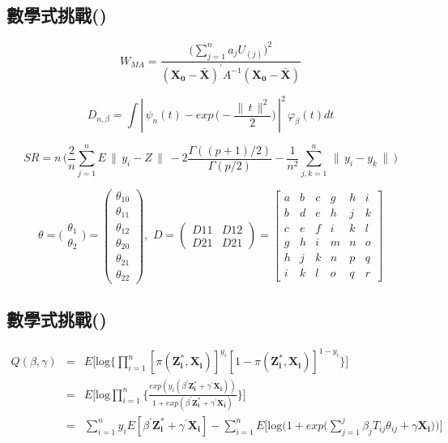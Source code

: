 \subsection{數學式挑戰(\uppercase\expandafter{})}
$$W_{MA} = \frac{\bigg( \sum_{j = 1}^n a_j U_{(j)}\bigg)^2}{(\mathbf{X_0} - \bar{\mathbf{X}})^{\displaystyle '} A^{-1}(\mathbf{X_0} - \bar{\mathbf{X}})}$$

$$D_{n, \beta} = \int |\,\psi_n(t) - exp \,\bigg( -\frac{\lVert\, t \,\lVert ^2}{2} \bigg) \,|^2 \,\varphi_{\beta}(t)dt$$

$$SR = n \,\bigg(\frac{2}{n}\sum_{j = 1}^{n} E\,\lVert\,y_i - Z\,\lVert \,- 2\frac{\Gamma((p+1)/2)}{\Gamma(p/2)} - \frac{1}{n^2} \sum_{j,k = 1}^{n}\, \lVert\, y_i - y_k \,\lVert\,\bigg)$$

$$ \theta = \bigg(
\begin{array}{c}
\theta_1 \\
\theta_2 
\end{array} \bigg) = \left(
\begin{array}{c}
\theta_{10} \\
\theta_{11} \\
\theta_{12} \\
\theta_{20} \\
\theta_{21} \\
\theta_{22}
\end{array} \right), \,\,D = \left( 
\begin{array}{cc}
D11 & D12\\
D21 & D21
\end{array} \right) = \left[
\begin{array}{ccc|ccc}
a & b & c & g & h & i \\
b & d & e & h & j & k \\
c & e & f & i & k & l \\
\hline
g & h & i & m & n & o \\
h & j & k & n & p & q \\
i & k & l & o & q & r 
\end{array} \right] 
$$\bigskip

\subsection{數學式挑戰(\uppercase\expandafter{})}
\begin{eqnarray}
Q(\beta, \gamma) & = & E \bigg[\text{log}\bigg\{\prod_{i = 1}^n [\pi(\mathbf{Z_i^*}, \mathbf{X_i})]^{y_i}[1 - \pi(\mathbf{Z_i^*}, \mathbf{X_i})]^{1 - y_i} \bigg\}\bigg]\nonumber\\
& = & E \bigg[\text{log}\prod_{i = 1}^n \bigg\{ \frac{exp(y_i(\beta^{\prime}\mathbf{Z_i^*} + \gamma^{\prime}\mathbf{X_i}))}{1 + exp(\beta^{\prime}\mathbf{Z_i^*} + \gamma^{\prime}\mathbf{X_i})}\bigg\}\bigg]\nonumber\\
& = & \sum_{i = 1}^n y_i E[\beta^{\prime}\mathbf{Z_i^*} + \gamma^{\prime}\mathbf{X_i}] - \sum_{i = 1}^n E \bigg[ \text{log}\bigg( 1 + exp\bigg( \sum_{j = 1}^j \beta_j T_{ij} \theta_{ij} + \gamma \mathbf{X_i}\bigg)\bigg)\bigg] \nonumber
\end{eqnarray}

